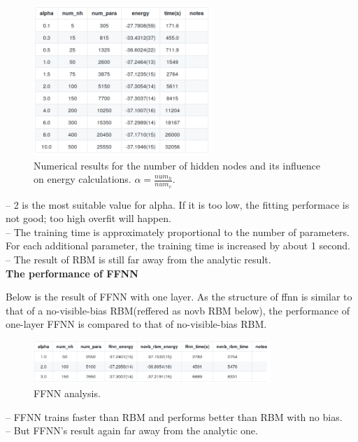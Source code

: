 \documentclass{article}
\begin{document}
\begin{figure}[!htb]
	\centering
	\includegraphics[width=0.6\textwidth]{./images/alpha.png}
	\caption{\label{tab:alpha} Numerical results for the number of hidden nodes and its influence on energy calculations. $\alpha = \frac{num_{h}}{num_{v}}$.} 
\end{figure}

    -- 2 is the most suitable value for alpha. If it is too low, the fitting performace is not good; too high overfit will happen. \\
    -- The training time is approximately proportional to the number of parameters. For each additional parameter, the training time is increased by about 1 second. \\
    -- The result of RBM is still far away from the analytic result. \\

\textbf{The performance of FFNN}

Below is the result of FFNN with one layer. As the structure of ffnn is similar to that of a no-visible-bias RBM(reffered as novb RBM below), the performance of one-layer FFNN is compared to that of no-visible-bias RBM.

\begin{figure}[!htb]
	\centering
	\includegraphics[width=0.8\textwidth]{./images/ffnn.png}
	\caption{\label{tab:ffnn} FFNN analysis.} 
\end{figure}    

    -- FFNN trains faster than RBM and performs better than RBM with no bias.\\
    -- But FFNN's result again far away from the analytic one. \\
\end{document}
